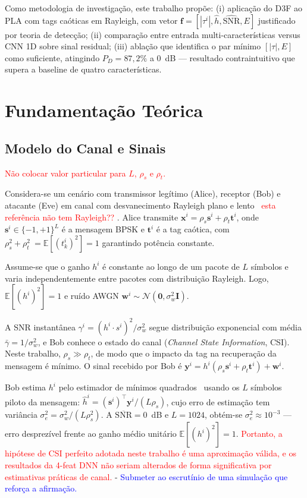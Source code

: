 \documentclass{sbrt}
\newcommand{\bblue}[1]{\textcolor{blue}{#1}}
\newcommand{\rred}[1]{\textcolor{red}{#1}}
\begin{document}
Como metodologia de investigação, este trabalho propõe: (i) aplicação do D3F ao PLA com tags caóticas em Rayleigh, com vetor $\mathbf{f} = [|\tau^i|, \hat{h}, \widehat{\text{SNR}}, E]$ justificado por teoria de detecção; (ii) comparação entre entrada multi-características versus CNN 1D sobre sinal residual; (iii) ablação que identifica o par mínimo $[|\tau|, E]$ como suficiente, atingindo $P_D = 87{,}2\%$ a 0~dB — resultado contraintuitivo que supera a baseline de quatro características.

\section{Fundamentação Teórica}

\subsection{Modelo do Canal e Sinais}

\rred{Não colocar valor particular para 
$L$, $\rho_s$ e $\rho_t$.}

Considera-se um cenário com transmissor legítimo (Alice), receptor (Bob) e atacante (Eve) em canal com desvanecimento  Rayleigh plano e lento~\cite{ref_joao} \rred{esta referência não tem Rayleigh??} . Alice transmite $\mathbf{x}^i = \rho_s \mathbf{s}^i + \rho_t \mathbf{t}^i$, onde $\mathbf{s}^i \in \{-1,+1\}^L$ é a mensagem BPSK e $\mathbf{t}^i$ é a tag caótica, com $\rho_s^2 + \rho_t^2\ =  \mathbb{E}[(t_k^i)^2] = 1$ garantindo potência constante. 

Assume-se que o ganho $h^i$ é constante ao longo de um pacote de $L$ símbolos e varia independentemente entre pacotes com distribuição Rayleigh. Logo, $\mathbb{E}[(h^i)^2] = 1$ e ruído AWGN $\mathbf{w}^i \sim \mathcal{N}(\mathbf{0}, \sigma_w^2\mathbf{I})$.

A SNR instantânea $\gamma^i = (h^i \cdot s^i)^2/\sigma_w^2$ segue distribuição exponencial com média $\bar{\gamma} = 1/\sigma_w^2$, e Bob conhece o estado do canal (\textit{Channel State Information}, CSI).  Neste trabalho, $\rho_s \gg \rho_t$, de modo que o impacto da tag na recuperação da mensagem é mínimo. O sinal recebido por Bob é $\mathbf{y}^i = h^i(\rho_s \mathbf{s}^i + \rho_t \mathbf{t}^i) + \mathbf{w}^i$.

Bob estima $h^i$ pelo estimador de mínimos quadrados~\cite{ref_kay} usando os $L$ símbolos piloto da mensagem: $\hat{h}^i = (\mathbf{s}^i)^\top \mathbf{y}^i / (L \rho_s)$, cujo erro de estimação tem variância $\sigma_e^2 = \sigma_w^2 / (L \rho_s^2)$. A $\overline{\text{SNR}} = 0$~dB e $L = 1024$, obtém-se $\sigma_e^2 \approx 10^{-3}$ — erro desprezível frente ao ganho médio unitário $\mathbb{E}[(h^i)^2] = 1$. \rred{Portanto, a hipótese de CSI perfeito adotada neste trabalho é uma aproximação válida, e os resultados da 4-feat DNN não seriam alterados de forma significativa por estimativas práticas de canal.} - \bblue{Submeter ao escrutínio de uma simulação que reforça a afirmação.}
\end{document}
